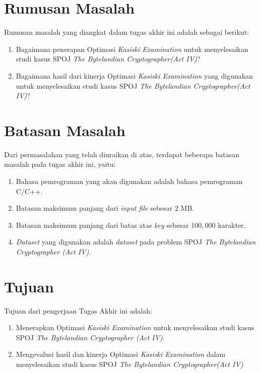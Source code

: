   \section{Rumusan Masalah}
    Rumusan masalah yang diangkat dalam tugas akhir ini adalah sebagai berikut: 
    \begin{enumerate}
      \item Bagaimana penerapan Optimasi \textit{Kasiski Examination} untuk menyelesaikan studi kasus SPOJ \textit{The Bytelandian Cryptographer(Act IV)}?
      \item Bagaimana hasil dari kinerja Optimasi \textit{Kasiski Examination} yang digunakan untuk menyelesaikan studi kasus SPOJ \textit{The Bytelandian Cryptographer(Act IV)}?
    \end{enumerate}

  \section{Batasan Masalah}
  	\label{batasan-masalah}
    Dari permasalahan yang telah diuraikan di atas, terdapat beberapa batasan masalah pada tugas akhir ini, yaitu:
    \begin{enumerate}
      \item Bahasa pemrograman yang akan digunakan adalah bahasa pemrograman C/C++.
      \item Batasan maksimum panjang dari \textit{input file} sebesar $2$ MB.	
      \item Batasan maksimum panjang dari batas atas \textit{key} sebesar $100,000$ karakter.
      \item \textit{Dataset} yang digunakan adalah \textit{dataset} pada problem SPOJ \textit{The Bytelandian Cryptographer (Act IV)}.
    \end{enumerate}

  \section{Tujuan}
  \label{tujuan}
    Tujuan dari pengerjaan Tugas Akhir ini adalah: 
    \begin{enumerate}
      \item Menerapkan Optimasi \textit{Kasiski Examination} untuk menyelesaikan studi kasus SPOJ \textit{The Bytelandian Cryptographer (Act IV)}.
      \item Mengevalusi hasil dan kinerja Optimasi \textit{Kasiski Examination} dalam menyelesaikan studi kasus SPOJ \textit{The Bytelandian Cryptographer(Act IV)}
    \end{enumerate}
    
